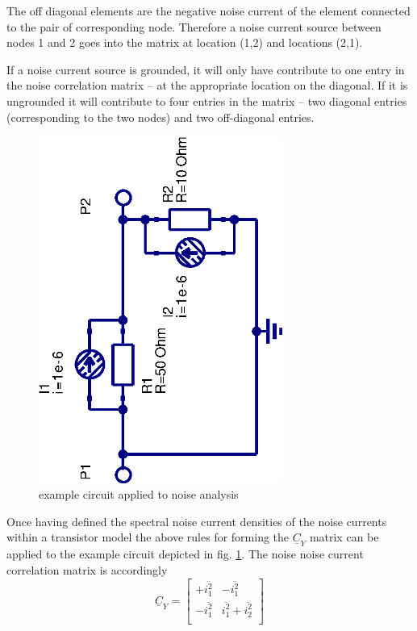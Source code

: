 \documentclass[10pt]{report}
\begin{document}
\addvspace{12pt}

The off diagonal elements are the negative noise current of the
element connected to the pair of corresponding node.  Therefore a
noise current source between nodes 1 and 2 goes into the matrix at
location (1,2) and locations (2,1).

\addvspace{12pt}

If a noise current source is grounded, it will only have contribute to
one entry in the noise correlation matrix -- at the appropriate
location on the diagonal.  If it is ungrounded it will contribute to
four entries in the matrix -- two diagonal entries (corresponding to
the two nodes) and two off-diagonal entries.

\begin{figure}[ht]
\begin{center}
\includegraphics[angle=-90,width=8cm]{CYexample}
\end{center}
\caption{example circuit applied to noise analysis}
\label{fig:CYexample}
\end{figure}
\FloatBarrier

Once having defined the spectral noise current densities of the noise
currents within a transistor model the above rules for forming the
$\underline{C}_Y$ matrix can be applied to the example circuit
depicted in fig. \ref{fig:CYexample}.  The noise noise current
correlation matrix is accordingly
\begin{equation}
\underline{C}_Y =
\begin{bmatrix}
+\overline{i_1^2} & -\overline{i_1^2}\\
-\overline{i_1^2} & \overline{i_1^2} + \overline{i_2^2}\\
\end{bmatrix}
\end{equation}
\end{document}
